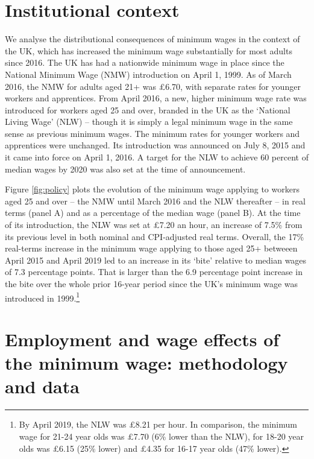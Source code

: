 
\section{Institutional context} \label{sec:institution}

We analyse the distributional consequences of minimum wages in the context of the UK, which has increased the minimum wage substantially for most adults since 2016. The UK has had a nationwide minimum wage in place since the National Minimum Wage (NMW) introduction on April 1, 1999. As of March 2016, the NMW for adults aged 21+ was \pounds 6.70, with separate rates for younger workers and apprentices. From April 2016, a new, higher minimum wage rate was introduced for workers aged 25 and over, branded in the UK as the `National Living Wage' (NLW) -- though it is simply a legal minimum wage in the same sense as previous minimum wages. The minimum rates for  younger workers and apprentices were unchanged. Its introduction was announced on July 8, 2015 and it came into force on April 1, 2016. A target for the NLW to achieve 60 percent of median wages by 2020 was also set at the time of announcement.\par

Figure \ref{fig:policy} plots the evolution of the minimum wage applying to workers aged 25 and over -- the NMW until March 2016 and the NLW thereafter -- in real terms (panel A) and as a percentage of the median wage (panel B). At the time of its introduction, the NLW was set at \pounds 7.20 an hour, an increase of 7.5\% from its previous level in both nominal and CPI-adjusted real terms. Overall, the 17\% real-terms increase in the minimum wage applying to those aged 25+ betweeen April 2015 and April 2019 led to an increase in its `bite' relative to median wages of 7.3 percentage points. That is larger than the 6.9 percentage point increase in the bite over the whole prior 16-year period since the UK's minimum wage was introduced in 1999.\footnote{By April 2019, the NLW was \pounds 8.21 per hour. In comparison, the minimum wage for 21-24 year olds was \pounds 7.70 (6\% lower than the NLW), for 18-20 year olds was \pounds 6.15 (25\% lower) and \pounds 4.35 for 16-17 year olds (47\% lower).}   \par




\section{Employment and wage effects of the minimum wage: methodology and data} \label{sec:lm_methodology}

